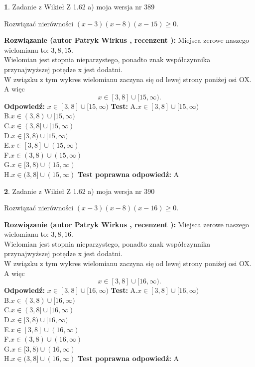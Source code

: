 \documentclass[12pt, a4paper]{article}
\theoremstyle{definition} %
\newtheorem{zad}{}
\newcommand{\zadStart}[1]{\begin{zad}#1\newline}
\newcommand{\zadStop}{\end{zad}}
\newcommand{\rozwStart}[2]{\noindent \textbf{Rozwiązanie (autor #1 , recenzent #2): }\newline}
\newcommand{\rozwStop}{\newline}
\newcommand{\odpStart}{\noindent \textbf{Odpowiedź:}\newline}
\newcommand{\odpStop}{\newline}
\newcommand{\testStart}{\noindent \textbf{Test:}\newline}
\newcommand{\testStop}{\newline}
\newcommand{\kluczStart}{\noindent \textbf{Test poprawna odpowiedź:}\newline}
\newcommand{\kluczStop}{\newline}
\begin{document}
\zadStart{Zadanie z Wikieł Z 1.62 a) moja wersja nr 389}

Rozwiązać nierówności $(x-3)(x-8)(x-15)\ge0$.
\zadStop
\rozwStart{Patryk Wirkus}{}
Miejsca zerowe naszego wielomianu to: $3, 8, 15$.\\
Wielomian jest stopnia nieparzystego, ponadto znak współczynnika przy\linebreak najwyższej potędze x jest dodatni.\\ W związku z tym wykres wielomianu zaczyna się od lewej strony poniżej osi OX. A więc $$x \in [3,8] \cup [15,\infty).$$
\rozwStop
\odpStart
$x \in [3,8] \cup [15,\infty)$
\odpStop
\testStart
A.$x \in [3,8] \cup [15,\infty)$\\
B.$x \in (3,8) \cup [15,\infty)$\\
C.$x \in (3,8] \cup [15,\infty)$\\
D.$x \in [3,8) \cup [15,\infty)$\\
E.$x \in [3,8] \cup (15,\infty)$\\
F.$x \in (3,8) \cup (15,\infty)$\\
G.$x \in [3,8) \cup (15,\infty)$\\
H.$x \in (3,8] \cup (15,\infty)$
\testStop
\kluczStart
A
\kluczStop



\zadStart{Zadanie z Wikieł Z 1.62 a) moja wersja nr 390}

Rozwiązać nierówności $(x-3)(x-8)(x-16)\ge0$.
\zadStop
\rozwStart{Patryk Wirkus}{}
Miejsca zerowe naszego wielomianu to: $3, 8, 16$.\\
Wielomian jest stopnia nieparzystego, ponadto znak współczynnika przy\linebreak najwyższej potędze x jest dodatni.\\ W związku z tym wykres wielomianu zaczyna się od lewej strony poniżej osi OX. A więc $$x \in [3,8] \cup [16,\infty).$$
\rozwStop
\odpStart
$x \in [3,8] \cup [16,\infty)$
\odpStop
\testStart
A.$x \in [3,8] \cup [16,\infty)$\\
B.$x \in (3,8) \cup [16,\infty)$\\
C.$x \in (3,8] \cup [16,\infty)$\\
D.$x \in [3,8) \cup [16,\infty)$\\
E.$x \in [3,8] \cup (16,\infty)$\\
F.$x \in (3,8) \cup (16,\infty)$\\
G.$x \in [3,8) \cup (16,\infty)$\\
H.$x \in (3,8] \cup (16,\infty)$
\testStop
\kluczStart
A
\kluczStop
\end{document}

